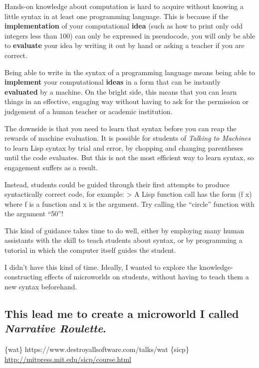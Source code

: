 Hands-on knowledge about computation is hard to acquire without knowing
a little syntax in at least one programming language. This is because if
the \textbf{implementation} of your computational \textbf{idea} (such as
how to print only odd integers less than 100) can only be expressed in
pseudocode, you will only be able to \textbf{evaluate} your idea by
writing it out by hand or asking a teacher if you are correct.

Being able to write in the syntax of a programming language means being
able to \textbf{implement} your computational \textbf{ideas} in a form
that can be instantly \textbf{evaluated} by a machine. On the bright
side, this means that you can learn things in an effective, engaging way
without having to ask for the permission or judgement of a human teacher
or academic institution.

The downside is that you need to learn that syntax before you can reap
the rewards of machine evaluation. It is possible for students of
\emph{Talking to Machines} to learn Lisp syntax by trial and error, by
chopping and changing parentheses until the code evaluates. But this is
not the most efficient way to learn syntax, so engagement suffers as a
result.

Instead, students could be guided through their first attempts to
produce syntactically correct code, for example: \textgreater{} A Lisp
function call has the form (f x) where f is a function and x is the
argument. Try calling the ``circle'' function with the argument ``50''!

This kind of guidance takes time to do well, either by employing many
human assistants with the skill to teach students about syntax, or by
programming a tutorial in which the computer itself guides the student.

I didn't have this kind of time. Ideally, I wanted to explore the
knowledge-constructing effects of microworlds on students, without
having to teach them a new syntax beforehand.

\subsection{This lead me to create a microworld I called \emph{Narrative
Roulette}.}

\{wat\} https://www.destroyallsoftware.com/talks/wat \{sicp\}
\href{http://mitpress.mit.edu/sicp/course.html}{http://mitpress.mit.edu/sicp/course.html}
